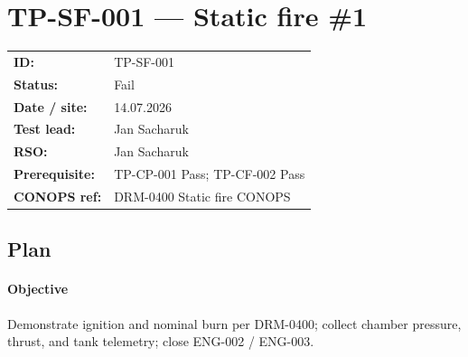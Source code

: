 \section{TP-SF-001 --- Static fire \#1}

\begin{tabular}{@{}ll@{}}
\textbf{ID:} & TP-SF-001 \\
\textbf{Status:} & Fail \\
\textbf{Date / site:} & 14.07.2026 \\
\textbf{Test lead:} & Jan Sacharuk \\
\textbf{RSO:} & Jan Sacharuk \\
\textbf{Prerequisite:} & TP-CP-001 Pass; TP-CF-002 Pass \\
\textbf{CONOPS ref:} & DRM-0400 Static fire CONOPS \\
\end{tabular}

\subsection*{Plan}

\paragraph{Objective}
Demonstrate ignition and nominal burn per DRM-0400; collect chamber pressure,
thrust, and tank telemetry; close ENG-002 / ENG-003.

